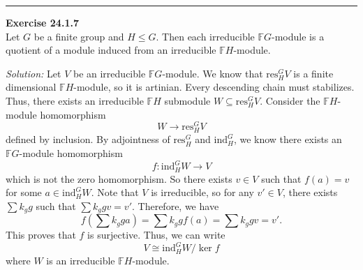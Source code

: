 \documentclass[a4paper, 12pt]{article}
\newenvironment{problem}[2][Exercise]
    { \begin{mdframed}[backgroundcolor=gray!20] \textbf{#1 #2} \\}
    {  \end{mdframed}}
\newenvironment{solution}
    {\textit{Solution:}}
    {}
\newcommand{\ind}{\text{ind}}
\newcommand{\res}{\text{res}}
\begin{document}
\noindent\rule{7in}{2.8pt}
\begin{problem}{24.1.7}
Let \(G\) be a finite group and \(H\leq G\). Then each irreducible \(\mathbb{F}G\)-module is a quotient of a module induced from an irreducible \(\mathbb{F}H\)-module. 
\end{problem}
\begin{solution}
Let \(V\) be an irreducible \(\mathbb{F}G\)-module. We know that \(\res^G_HV\) is a finite dimensional \(\mathbb{F}H\)-module, so it is artinian. Every descending chain must stabilizes. Thus, there exists an irreducible \(\mathbb{F}H\) submodule \(W\subseteq \res^G_HV\). Consider the \(\mathbb{F}H\)-module homomorphism 
\[W\rightarrow \res^G_HV\]
defined by inclusion. By adjointness of \(\res^G_H\) and \(\ind^G_H\), we know there exists an \(\mathbb{F}G\)-module homomorphism 
\[f:\ind^G_HW\rightarrow V\]
which is not the zero homomorphism. So there exists \(v\in V\) such that \(f(a)=v\) for some \(a\in \ind^G_HW\). Note that \(V\) is irreducible, so for any \(v'\in V\), there exists \(\sum k_g g\) such that \(\sum k_g gv=v'\). Therefore, we have 
\[f(\sum k_g ga)=\sum k_g gf(a)=\sum k_g gv=v'.\]
This proves that \(f\) is surjective. Thus, we can write 
\[V\cong \ind^G_HW/\ker f\]
where \(W\) is an irreducible \(\mathbb{F}H\)-module.
\end{solution}
\end{document}
